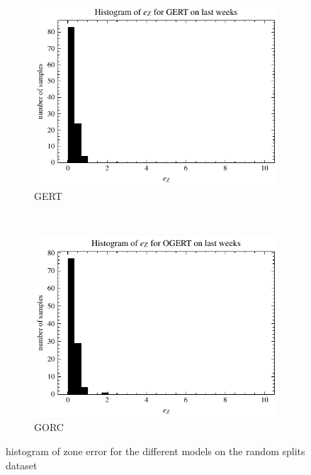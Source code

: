 \begin{figure}[ht]
    \\[1ex]
    \centering
    \begin{subfigure}[t]{0.5\textwidth}
        \centering
        \includegraphics[width=\textwidth]{chapters/figures/result_histograms/result_histogram_last_weeks_zone_sum_error_GERT.pdf}
        \captionsetup{width=.9\linewidth}
        \caption{GERT}
    \end{subfigure}%
    ~ 
    \begin{subfigure}[t]{0.5\textwidth}
        \centering
        \includegraphics[width=\textwidth]{chapters/figures/result_histograms/result_histogram_last_weeks_zone_sum_error_OGERT.pdf}
        \captionsetup{width=.9\linewidth}
        \caption{GORC}
    \end{subfigure}
    \caption{histogram of zone error for the different models on the random splits dataset}
    \label{fig:result_last_weeks_dist}
\end{figure}

